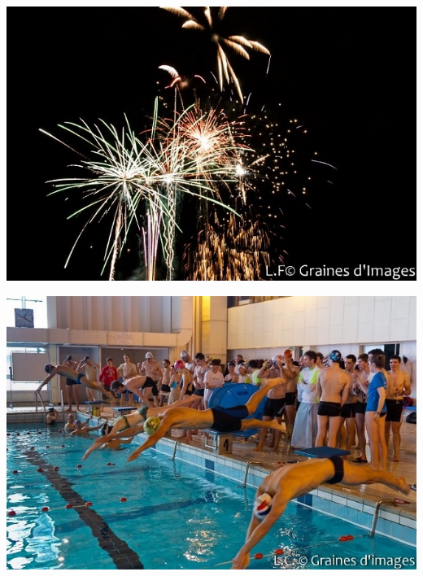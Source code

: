 \documentclass[hidelinks, paper=a4, fontsize=13pt]{report}
\begin{document}
\begin{minipage}[c]{.48\linewidth}
	  \begin{center}
      \includegraphics[scale =1]{Annexes/Images/prez1}
		\end{center}
 \end{minipage} \hfill
\begin{minipage}[c]{.48\linewidth}
		\begin{center}
      \includegraphics[scale =1]{Annexes/Images/prez2}
		\end{center}
\end{minipage}
\vspace{20mm}
\end{document}

